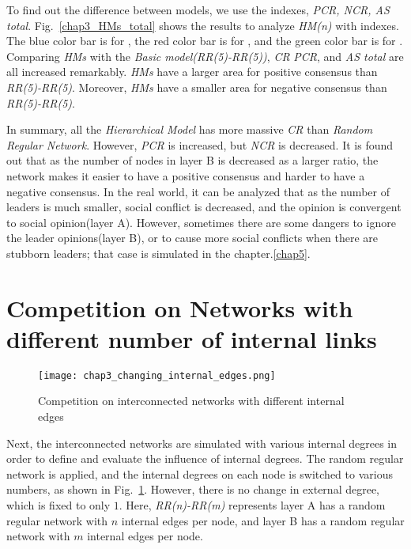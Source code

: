 To find out the difference between models, we use the indexes, \textit{PCR, NCR, AS total}. Fig.~\ref{chap3_HMs_total} shows the results to analyze \textit{HM(n)} with indexes. The blue color bar is for , the red color bar is for , and the green color bar is for . Comparing \textit{HMs} with the \textit{Basic model(RR(5)-RR(5))}, \textit{CR} \textit{PCR}, and \textit{AS total} are all increased remarkably. \textit{HMs} have a larger area for positive consensus than \textit{RR(5)-RR(5)}. Moreover, \textit{HMs} have a smaller area for negative consensus than \textit{RR(5)-RR(5)}. 

In summary, all the \textit{Hierarchical Model} has more massive \textit{CR} than \textit{Random Regular Network}. However, \textit{PCR} is increased, but \textit{NCR} is decreased. It is found out that as the number of nodes in layer B is decreased as a larger ratio, the network makes it easier to have a positive consensus and harder to have a negative consensus. In the real world, it can be analyzed that as the number of leaders is much smaller, social conflict is decreased, and the opinion is convergent to social opinion(layer A). However, sometimes there are some dangers to ignore the leader opinions(layer B), or to cause more social conflicts when there are stubborn leaders; that case is simulated in the chapter.\ref{chap5}. \\

\section{Competition on Networks with different number of internal links}

\begin{figure}[!htb]
	\centering
	\texttt{[image: chap3\_changing\_internal\_edges.png]}
	\caption{Competition on interconnected networks with different internal edges}
	\label{chap3_changing_internal_edges}
\end{figure}

Next, the interconnected networks are simulated with various internal degrees in order to define and evaluate the influence of internal degrees. The random regular network is applied, and the internal degrees on each node is switched to various numbers, as shown in Fig.~\ref{chap3_changing_internal_edges}. However, there is no change in external degree, which is fixed to only $1$. Here, \textit{RR(n)-RR(m)} represents layer A has a random regular network with $n$ internal edges per node, and layer B has a random regular network with $m$ internal edges per node.

